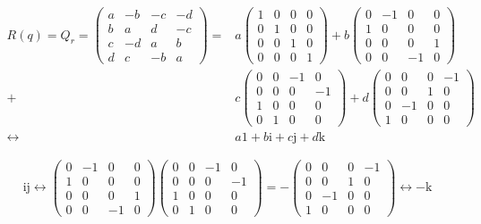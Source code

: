 \documentclass[
]{book}
\theoremstyle{definition}
\theoremstyle{definition}
\theoremstyle{definition}
\theoremstyle{definition}
\theoremstyle{remark}
\begin{document}
\[
\begin{aligned}
R\left(q\right)=Q_{{\scriptscriptstyle r}}=\begin{pmatrix}a & -b & -c & -d\\
b & a & d & -c\\
c & -d & a & b\\
d & c & -b & a
\end{pmatrix}= & a\begin{pmatrix}1 & 0 & 0 & 0\\
0 & 1 & 0 & 0\\
0 & 0 & 1 & 0\\
0 & 0 & 0 & 1
\end{pmatrix}+b\begin{pmatrix}0 & -1 & 0 & 0\\
1 & 0 & 0 & 0\\
0 & 0 & 0 & 1\\
0 & 0 & -1 & 0
\end{pmatrix}\\
+ & c\begin{pmatrix}0 & 0 & -1 & 0\\
0 & 0 & 0 & -1\\
1 & 0 & 0 & 0\\
0 & 1 & 0 & 0
\end{pmatrix}+d\begin{pmatrix}0 & 0 & 0 & -1\\
0 & 0 & 1 & 0\\
0 & -1 & 0 & 0\\
1 & 0 & 0 & 0
\end{pmatrix}\\
\leftrightarrow & a1+b\mathrm{i}+c\mathrm{j}+d\mathrm{k}
\end{aligned}
\]

\[
\mathrm{i}\mathrm{j}\leftrightarrow\begin{pmatrix}0 & -1 & 0 & 0\\
1 & 0 & 0 & 0\\
0 & 0 & 0 & 1\\
0 & 0 & -1 & 0
\end{pmatrix}\begin{pmatrix}0 & 0 & -1 & 0\\
0 & 0 & 0 & -1\\
1 & 0 & 0 & 0\\
0 & 1 & 0 & 0
\end{pmatrix}=-\begin{pmatrix}0 & 0 & 0 & -1\\
0 & 0 & 1 & 0\\
0 & -1 & 0 & 0\\
1 & 0 & 0 & 0
\end{pmatrix}\leftrightarrow-\mathrm{k}
\]
\end{document}

